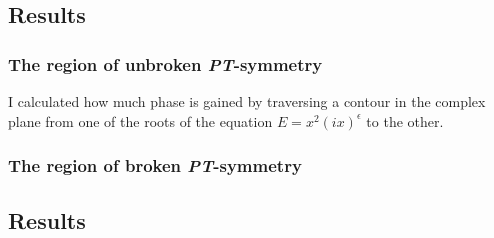 \documentclass[10pt, a4paper, singlespacing, headsepline]{article}
\newcommand\PT{\textit{PT}}
\begin{document}
\subsection{Results}

\subsubsection{The region of unbroken \PT-symmetry}


I calculated how much phase is gained by traversing a contour in the complex plane from one of the roots of the equation $E = x^2(ix)^\epsilon$ to the other.







\subsubsection{The region of broken \PT-symmetry}

\subsection{Results}



\end{document}
